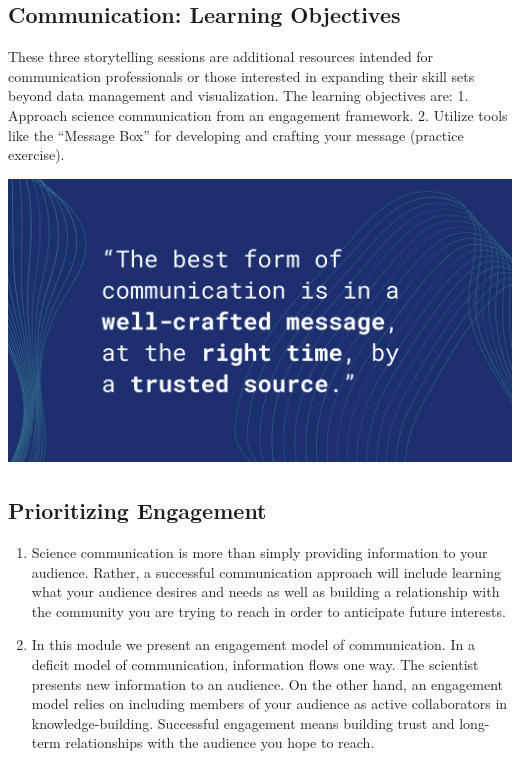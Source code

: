 \documentclass[
]{book}
\begin{document}
\hypertarget{communication-learning-objectives}{%
\subsection{Communication: Learning Objectives}\label{communication-learning-objectives}}

These three storytelling sessions are additional resources intended for communication professionals or those interested in expanding their skill sets beyond data management and visualization. The learning objectives are:
1. Approach science communication from an engagement framework.
2. Utilize tools like the ``Message Box'' for developing and crafting your message (practice exercise).

\includegraphics{images/Mantra_for_Lilli.png}

\hypertarget{prioritizing-engagement}{%
\subsection{Prioritizing Engagement}\label{prioritizing-engagement}}

\begin{enumerate}
\def\labelenumi{\arabic{enumi}.}
\item
  Science communication is more than simply providing information to your audience. Rather, a successful communication approach will include learning what your audience desires and needs as well as building a relationship with the community you are trying to reach in order to anticipate future interests.
\item
  In this module we present an engagement model of communication. In a deficit model of communication, information flows one way. The scientist presents new information to an audience. On the other hand, an engagement model relies on including members of your audience as active collaborators in knowledge-building. Successful engagement means building trust and long-term relationships with the audience you hope to reach.
\end{enumerate}
\end{document}
